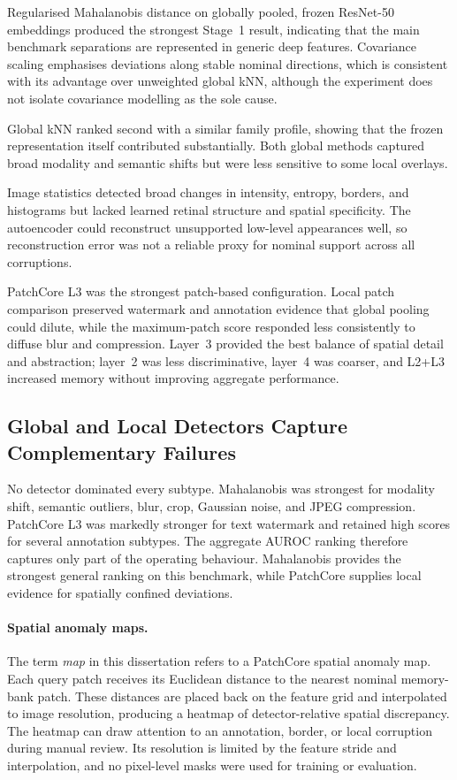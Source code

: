 \documentclass[fleqn,12pt]{olplainarticle}
\begin{document}
Regularised Mahalanobis distance on globally pooled, frozen ResNet-50 embeddings produced the strongest Stage~1 result, indicating that the main benchmark separations are represented in generic deep features. Covariance scaling emphasises deviations along stable nominal directions, which is consistent with its advantage over unweighted global kNN, although the experiment does not isolate covariance modelling as the sole cause.

Global kNN ranked second with a similar family profile, showing that the frozen representation itself contributed substantially. Both global methods captured broad modality and semantic shifts but were less sensitive to some local overlays.

Image statistics detected broad changes in intensity, entropy, borders, and histograms but lacked learned retinal structure and spatial specificity. The autoencoder could reconstruct unsupported low-level appearances well, so reconstruction error was not a reliable proxy for nominal support across all corruptions.

PatchCore L3 was the strongest patch-based configuration. Local patch comparison preserved watermark and annotation evidence that global pooling could dilute, while the maximum-patch score responded less consistently to diffuse blur and compression. Layer~3 provided the best balance of spatial detail and abstraction; layer~2 was less discriminative, layer~4 was coarser, and L2+L3 increased memory without improving aggregate performance.

\subsection{Global and Local Detectors Capture Complementary Failures}
\label{subsec:discussion_complementarity}

No detector dominated every subtype. Mahalanobis was strongest for modality
shift, semantic outliers, blur, crop, Gaussian noise, and JPEG compression.
PatchCore L3 was markedly stronger for text watermark and retained high scores
for several annotation subtypes. The aggregate AUROC ranking therefore captures
only part of the operating behaviour. Mahalanobis provides the strongest
general ranking on this benchmark, while PatchCore supplies local evidence for
spatially confined deviations.

\paragraph{Spatial anomaly maps.}
The term \emph{map} in this dissertation refers to a PatchCore spatial anomaly
map. Each query patch receives its Euclidean distance to the nearest nominal
memory-bank patch. These distances are placed back on the feature grid and
interpolated to image resolution, producing a heatmap of detector-relative
spatial discrepancy. The heatmap can draw attention to an annotation, border,
or local corruption during manual review. Its resolution is limited by the
feature stride and interpolation, and no pixel-level masks were used for
training or evaluation.
\end{document}
